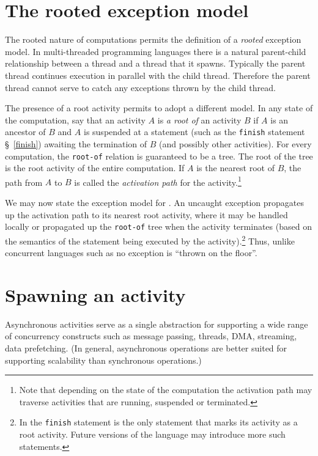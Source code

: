 \section{The \Xten{} rooted exception model}
\label{ExceptionModel}

The rooted nature of \Xten{} computations permits the definition of a
{\em rooted} exception model. In multi-threaded programming languages
there is a natural parent-child relationship between a thread and a
thread that it spawns. Typically the parent thread continues execution
in parallel with the child thread. Therefore the parent thread cannot
serve to catch any exceptions thrown by the child thread. 

The presence of a root activity permits \Xten{} to adopt a different
model.  In any state of the computation, say that an activity $A$ is
{\em a root of} an activity $B$ if $A$ is an ancestor of $B$ and $A$
is suspended at a statement (such as the {\tt finish} statement
\S~\ref{finish}) awaiting the termination of $B$ (and possibly other
activities). For every \Xten{} computation, the {\tt root-of} relation
is guaranteed to be a tree. The root of the tree is the root activity
of the entire computation. If $A$ is the nearest root of $B$, the path
from $A$ to $B$ is called the {\em activation path} for the
activity.\footnote{Note that depending on the state of the computation
the activation path may traverse activities that are running,
suspended or terminated.}

We may now state the exception model for \Xten.  An uncaught exception
propagates up the activation path to its nearest root activity, where
it may be handled locally or propagated up the {\tt root-of} tree when
the activity terminates (based on the semantics of the statement being
executed by the activity).\footnote{In \XtenCurrVer{} the {\tt finish}
statement is the only statement that marks its activity as a root
activity. Future versions of the language may introduce more such
statements.}  Thus, unlike concurrent languages such as \java{} no
exception is ``thrown on the floor''.

\section{Spawning an activity}\label{AsynchronousActivity}\label{AsyncActivity}

Asynchronous activities serve as a single abstraction for supporting a
wide range of concurrency constructs such as message passing, threads,
DMA, streaming, data prefetching. (In general, asynchronous operations
are better suited for supporting scalability than synchronous
operations.)

